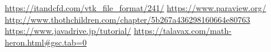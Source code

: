 \documentclass[12pt]{article}
\begin{document}
\begin{thebibliography}{99}
\url{https://itandcfd.com/vtk_file_format/241/}
\url{https://www.paraview.org/}
\url{http://www.thothchildren.com/chapter/5b267a436298160664e80763}
\url{https://www.javadrive.jp/tutorial/}
\url{https://talavax.com/math-heron.html#gsc.tab=0}
\end{thebibliography}
\end{document}
